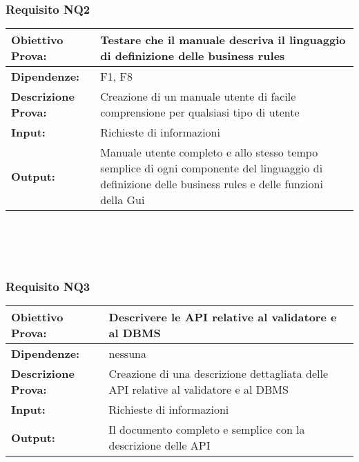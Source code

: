 \subsubsection{Requisito NQ2}
\begin{tabular}{||p{4cm}||p{8cm}||}
\hline
{\textbf {Obiettivo Prova:}}& Testare che il manuale descriva il linguaggio di definizione delle business rules \\ \hline
{\textbf{Dipendenze:}}&  F1, F8 \\ \hline
{\textbf{Descrizione Prova:}}&  Creazione di un manuale utente di facile comprensione per qualsiasi tipo di utente \\ \hline
{\textbf{Input:}}&  Richieste di informazioni \\ \hline  
{\textbf{Output:}}& Manuale utente completo e allo stesso tempo semplice di ogni componente del linguaggio di definizione delle business rules e delle funzioni della Gui \\ \hline
\end{tabular} \\
\\
\\
\subsubsection{Requisito NQ3}
\begin{tabular}{||p{4cm}||p{8cm}||}
\hline
{\textbf {Obiettivo Prova:}}& Descrivere le API relative al validatore e al DBMS\\ \hline
{\textbf{Dipendenze:}}& nessuna \\ \hline
{\textbf{Descrizione Prova:}}&  Creazione di una descrizione dettagliata delle API relative al validatore e al DBMS\\ \hline
{\textbf{Input:}}&  Richieste di informazioni \\ \hline  
{\textbf{Output:}}& Il documento completo e semplice con la descrizione delle API  \\ \hline
\end{tabular} \\















